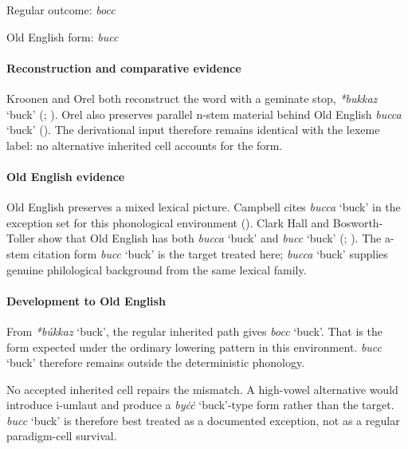 \documentclass[
  british,
  a4paper,
]{article}
\providecommand{\Recon}[1]{\emph{*#1}}
\begin{document}
Regular outcome: \emph{bocc}

Old English form: \emph{bucc}

\paragraph{Reconstruction and comparative
evidence}\label{reconstruction-and-comparative-evidence-149}

Kroonen and Orel both reconstruct the word with a geminate stop,
\Recon{bukkaz} `buck' (;
). Orel also preserves parallel
n-stem material behind Old English {\emph{bucca}} `buck'
(). The derivational input
therefore remains identical with the lexeme label: no alternative
inherited cell accounts for the form.

\paragraph{Old English evidence}\label{old-english-evidence-149}

Old English preserves a mixed lexical picture. Campbell cites
{\emph{bucca}} `buck' in the exception set for this phonological
environment ().
Clark Hall and Bosworth-Toller show that Old English has both
{\emph{bucca}} `buck' and {\emph{bucc}} `buck'
(;
). The
a-stem citation form {\emph{bucc}} `buck' is the target treated here;
{\emph{bucca}} `buck' supplies genuine philological background from the
same lexical family.

\paragraph{Development to Old
English}\label{development-to-old-english-149}

From \Recon{búkkaz} `buck', the regular inherited path gives
{\emph{bocc}} `buck'. That is the form expected under the ordinary
lowering pattern in this environment. {\emph{bucc}} `buck' therefore
remains outside the deterministic phonology.

No accepted inherited cell repairs the mismatch. A high-vowel
alternative would introduce i-umlaut and produce a {\emph{byċċ}}
`buck'-type form rather than the target. {\emph{bucc}} `buck' is
therefore best treated as a documented exception, not as a regular
paradigm-cell survival.
\end{document}
